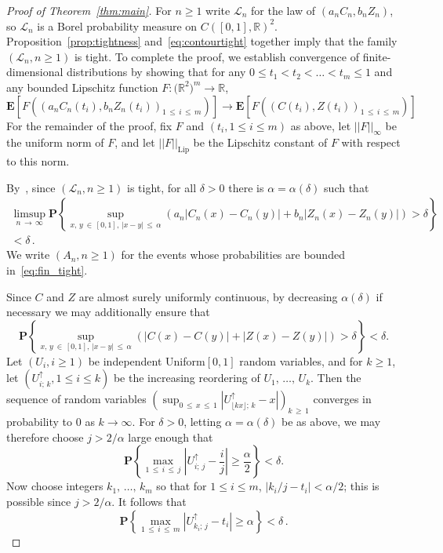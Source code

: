 \documentclass[AHL,Unicode,longabstracts,published]{cedram}
\providecommand{\R}{}
\renewcommand{\R}{\mathbb{R}}
\newcommand{\cL}{\mathcal{L}}
\newcommand{\lip}[1]{\ensuremath{|\!|#1|\!|_{\text{Lip}}}}
\newcommand{\ninf}[1]{\ensuremath{|\!|#1|\!|_{\infty}}}
\newcommand{\E}[1]{\mathbf{E}\left[#1\right]}
\newcommand{\p}[1]{\mathbf{P}\left\{#1\right\}}
\newcommand{\limC}{\ensuremath{C}}
\newcommand{\limZ}{\ensuremath{Z}}
\newcommand{\R}{\mathbb{R}}
\begin{document}
\begin{proof}[Proof of Theorem~\ref{thm:main}]
For $n \ge 1$ write $\cL_n$ for the law of $(a_n C_n,b_nZ_n)$, so $\cL_n$ is a Borel probability measure on $C([0,1],\R)^2$. Proposition~\ref{prop:tightness} and~\eqref{eq:contourtight} together imply that the family $(\cL_n,n \ge 1)$ is tight. To complete the proof, we establish convergence of finite-dimensional distributions by showing that for any $0 \le t_1 < t_2 < \ldots < t_m \le 1$ and any bounded Lipschitz function $F : \big(\R^2\big)^m \rightarrow \R$,
\begin{equation}\label{eq:toprove}
\E{F\left(\left(a_nC_n(t_i),b_nZ_n(t_i)\right)_{1\,\le\,i\,\le\,m}\right)} \to \E{F\left(\left(\limC(t_i),\limZ(t_i)\right)_{1\,\le\,i\,\le\,m}\right)}
\end{equation}
For the remainder of the proof, fix $F$ and $(t_i, 1 \le i \le m)$ as above, let $\ninf{F}$ be the uniform norm of $F$, and let $\lip{F}$ be the Lipschitz constant of $F$ with respect to this norm.

By~\cite[Theorem~8.2]{billingsley}, since $(\cL_n,n \ge 1)$ is tight, for all $\delta > 0$ there is $\alpha=\alpha(\delta)$ such that
\begin{multline}\label{eq:fin_tight}
\limsup_{n\,\to\,\infty} \p{\sup_{x,\,y\: \in\,[0,1],\,|x-y|\,\le\,\alpha} \left(a_n\left|C_n(x)-C_n(y)\right|+b_n\left|Z_n(x)-Z_n(y)\right|\right) > \delta}\\
< \delta\,.
\end{multline}
We write $(A_n,n \ge 1)$ for the events whose probabilities are bounded in~\eqref{eq:fin_tight}.

Since $C$ and $Z$ are almost surely uniformly continuous, by decreasing $\alpha(\delta)$ if necessary we may additionally ensure that
\begin{equation}\label{eq:lim_tight}
\p{\sup_{x,\,y \:\in\,[0,1],\,|x-y|\,\le\,\alpha} \left(\left|C(x)-C(y)\right| + \left|Z(x)-Z(y)\right|\right) > \delta} < \delta.
\end{equation}
Let $(U_i,i \ge 1)$ be independent Uniform$[0,1]$ random variables, and for $k \ge 1$, let $(U_{i;\,k}^\uparrow,1 \le i \le k)$ be the increasing reordering of $U_1,\,\ldots,\,U_k$. Then the sequence of random variables $(\sup_{0\,\le\,x \,\le\,1} |U_{\lfloor kx\rfloor;\,k}^\uparrow-x|)_{k\,\ge\,1}$ converges in probability to $0$ as $k \to \infty$. For $\delta > 0$, letting $\alpha=\alpha(\delta)$ be as above, we may therefore choose $j> 2/\alpha $ large enough that
\[
\p{\max_{1\,\le\,i\,\le\,j} \left| U_{i;\,j}^{\uparrow} - \frac{i}{j} \right| \ge \frac{\alpha}{2}} < \delta.
\]
Now choose integers $k_1,\,\ldots,\,k_m$ so that for $1 \le i \le m$, $|k_i/j-t_i| < \alpha/2$; this is possible since $j > 2/\alpha$. It follows that
\begin{equation}\label{eq:unif_llm}
\p{\max_{1\,\le\,i\,\le\,m} \left|U^\uparrow_{k_i;\,j}-t_i\right| \ge \alpha} < \delta\,.
\end{equation}


\end{proof}
\end{document}
